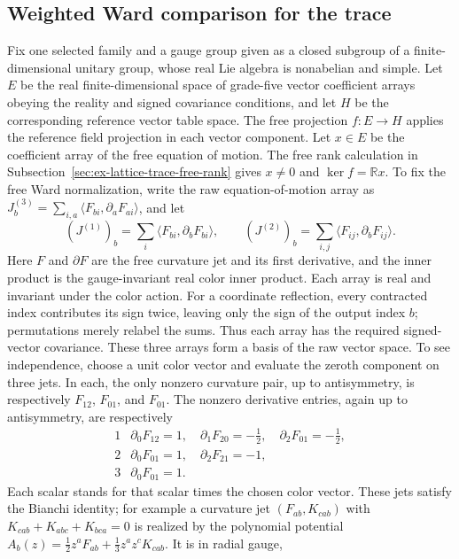 \subsection{Weighted Ward comparison for the trace}
\label{sec:trace-prosper-sensor}

Fix one selected family and a gauge group given as a closed subgroup of a
finite-dimensional unitary group, whose real Lie algebra is nonabelian and
simple. Let $E$ be the real
finite-dimensional space of grade-five vector coefficient arrays obeying the
reality and signed covariance conditions, and let $H$ be the corresponding
reference vector table space. The free projection $f:E\to H$ applies the
reference field projection in each vector component. Let $x\in E$ be the
coefficient array of the free equation of motion. The free rank calculation
in Subsection~\ref{sec:ex-lattice-trace-free-rank} gives $x\ne0$ and
$\ker f=\mathbb R x$. To fix the free Ward normalization, write the raw
equation-of-motion array as $J^{(3)}_b=\sum_{i,a}\langle F_{bi},\partial_a
F_{ai}\rangle$, and let
\[
 (J^{(1)})_b=\sum_i\langle F_{bi},\partial_b F_{bi}\rangle,\qquad
 (J^{(2)})_b=\sum_{i,j}\langle F_{ij},\partial_b F_{ij}\rangle.
\]
Here $F$ and $\partial F$ are the free curvature jet and its first derivative,
and the inner product is the gauge-invariant real color inner product. Each
array is real and invariant under the color action. For a coordinate
reflection, every contracted index contributes its sign twice, leaving only
the sign of the output index $b$; permutations merely relabel the sums. Thus
each array has the required signed-vector covariance. These three arrays form
a basis of the raw vector space. To see independence, choose
a unit color vector and evaluate the zeroth component on three jets. In each,
the only nonzero curvature pair, up to antisymmetry, is respectively $F_{12}$,
$F_{01}$, and $F_{01}$. The nonzero derivative entries, again up to
antisymmetry, are respectively
\[
 \begin{array}{c|l}
 1&\partial_0F_{12}=1,\quad \partial_1F_{20}=-\tfrac12,\quad
       \partial_2F_{01}=-\tfrac12,\\
 2&\partial_0F_{01}=1,\quad \partial_2F_{21}=-1,\\
 3&\partial_0F_{01}=1.
 \end{array}
\]
Each scalar stands for that scalar times the chosen color vector. These jets
satisfy the Bianchi identity; for example a curvature jet $(F_{ab},K_{cab})$
with $K_{cab}+K_{abc}+K_{bca}=0$ is realized by the polynomial potential
$A_b(z)=\tfrac12z^aF_{ab}+\tfrac13z^az^cK_{cab}$. It is in radial gauge,
